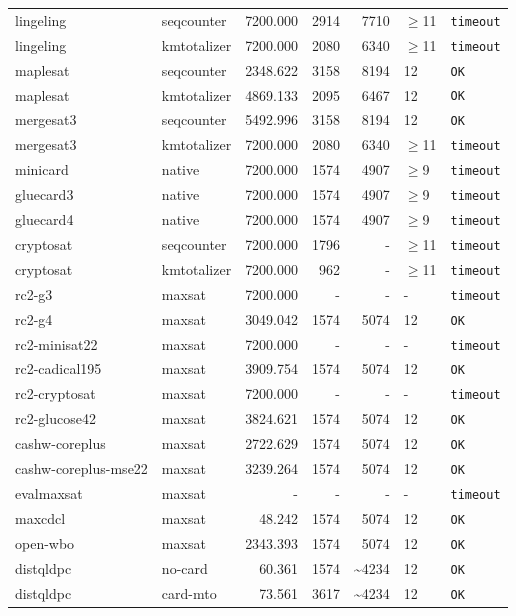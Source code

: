 \begin{longtable}{llrrrl p{}}
lingeling & seqcounter & 7200.000 & 2914 & 7710 & $\geq$11 & \texttt{timeout} \\
lingeling & kmtotalizer & 7200.000 & 2080 & 6340 & $\geq$11 & \texttt{timeout} \\
maplesat & seqcounter & 2348.622 & 3158 & 8194 & 12 & \texttt{OK} \\
maplesat & kmtotalizer & 4869.133 & 2095 & 6467 & 12 & \texttt{OK} \\
mergesat3 & seqcounter & 5492.996 & 3158 & 8194 & 12 & \texttt{OK} \\
mergesat3 & kmtotalizer & 7200.000 & 2080 & 6340 & $\geq$11 & \texttt{timeout} \\
minicard & native & 7200.000 & 1574 & 4907 & $\geq$9 & \texttt{timeout} \\
gluecard3 & native & 7200.000 & 1574 & 4907 & $\geq$9 & \texttt{timeout} \\
gluecard4 & native & 7200.000 & 1574 & 4907 & $\geq$9 & \texttt{timeout} \\
cryptosat & seqcounter & 7200.000 & 1796 & - & $\geq$11 & \texttt{timeout} \\
cryptosat & kmtotalizer & 7200.000 & 962 & - & $\geq$11 & \texttt{timeout} \\
rc2-g3 & maxsat & 7200.000 & - & - & - & \texttt{timeout} \\
rc2-g4 & maxsat & 3049.042 & 1574 & 5074 & 12 & \texttt{OK} \\
rc2-minisat22 & maxsat & 7200.000 & - & - & - & \texttt{timeout} \\
rc2-cadical195 & maxsat & 3909.754 & 1574 & 5074 & 12 & \texttt{OK} \\
rc2-cryptosat & maxsat & 7200.000 & - & - & - & \texttt{timeout} \\
rc2-glucose42 & maxsat & 3824.621 & 1574 & 5074 & 12 & \texttt{OK} \\
cashw-coreplus & maxsat & 2722.629 & 1574 & 5074 & 12 & \texttt{OK} \\
cashw-coreplus-mse22 & maxsat & 3239.264 & 1574 & 5074 & 12 & \texttt{OK} \\
evalmaxsat & maxsat & - & - & - & - & \texttt{timeout} \\
maxcdcl & maxsat & 48.242 & 1574 & 5074 & 12 & \texttt{OK} \\
open-wbo & maxsat & 2343.393 & 1574 & 5074 & 12 & \texttt{OK} \\
distqldpc & no-card & 60.361 & 1574 & \textasciitilde{}4234 & 12 & \texttt{OK} \\
distqldpc & card-mto & 73.561 & 3617 & \textasciitilde{}4234 & 12 & \texttt{OK} \\

\end{longtable}
